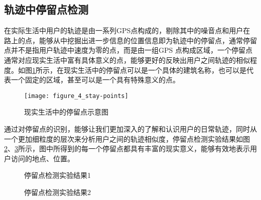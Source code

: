 \subsection{轨迹中停留点检测}
在实际生活中用户的轨迹是由一系列GPS点构成的，剔除其中的噪音点和用户在路上的点，能够从中挖掘出进一步信息的位置信息即为轨迹中的停留点，通常停留点并不是指用户轨迹中速度为零的点，而是由一组GPS 点构成区域，一个停留点通常对应现实生活中富有具体意义的点，能够更好的反映出用户之间轨迹的相似程度。如图\ref{fig:staypoint}所示，在现实生活中的停留点可以是一个具体的建筑名称，也可以是代表一个固定的区域，甚至可以是一个具有特殊意义的点。
\begin{figure}[htp]
\centering
\texttt{[image: figure\_4\_stay-points]}
\caption{现实生活中的停留点示意图}
\label{fig:staypoint}
\end{figure}
\par 通过对停留点的识别，能够让我们更加深入的了解和认识用户的日常轨迹，同时从一个更加细粒度的层次来分析用户之间的轨迹相似度，停留点检测实验结果如图\ref{fig:SP_1}、\ref{fig:SP_2}所示，图中所得到的每一个停留点都具有丰富的现实意义，能够有效地表示用户访问的地点、位置。
\begin{figure}[htb]
  \centering%
  \hspace{4em}%
  \caption{停留点检测实验结果1}
  \label{fig:SP_1}
\end{figure}
\begin{figure}[htb]
  \centering%
  \hspace{4em}%
  \caption{停留点检测实验结果2}
  \label{fig:SP_2}
\end{figure}
